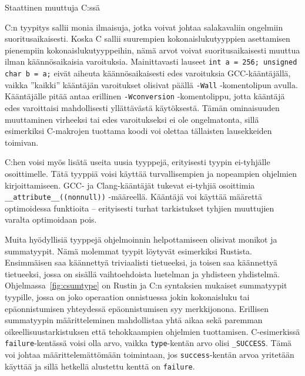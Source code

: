 \begin{listing}[ht!]
    \inputminted{C}{koodi/static.c}
    \caption{Staattinen muuttuja C:ssä}
    \label{fig:cstatic}
\end{listing}

C:n tyypitys sallii monia ilmaisuja, jotka voivat johtaa salakavaliin ongelmiin
suoritusaikaisesti. Koska C sallii suurempien kokonaislukutyyppien asettamisen
pienempiin kokonaislukutyyppeihin, nämä arvot voivat suoritusaikaisesti muuttua
ilman käännösaikaisia varoituksia. Mainittavasti lauseet \texttt{int a = 256;
unsigned char b = a;} eivät aiheuta käännösaikaisesti edes varoituksia
GCC-kääntäjällä, vaikka ''kaikki'' kääntäjän varoitukset olisivat päällä
\texttt{-Wall} -komentolipun avulla. Kääntäjälle pitää antaa erillinen
\texttt{-Wconversion} -komentolippu, jotta kääntäjä edes varoittaisi
mahdollisesti yllättävästä käytöksestä. Tämän ominaisuuden muuttaminen
virheeksi tai edes varoitukseksi ei ole ongelmatonta, sillä esimerkiksi
C-makrojen tuottama koodi voi olettaa tällaisten lausekkeiden toimivan.

C:hen voisi myös lisätä useita uusia tyyppejä, erityisesti tyypin ei-tyhjälle
osoittimelle. Tätä tyyppiä voisi käyttää turvallisempien ja nopeampien
ohjelmien kirjoittamiseen. GCC- ja Clang-kääntäjät tukevat ei-tyhjiä osoittimia
\texttt{\_\_attribute\_\_((nonnull))} -määreellä. Kääntäjä voi käyttää määrettä
optimoidessa funktioita -- erityisesti turhat tarkistukset tyhjien muuttujien
varalta optimoidaan pois.

Muita hyödyllisiä tyyppejä ohjelmoinnin helpottamiseen olisivat
monikot ja summatyypit. Nämä
molemmat tyypit löytyvät esimerkiksi Rustista. Ensimmäisen saa käännettyä
triviaalisti tietueeksi, ja toisen saa käännettyä tietueeksi, jossa on sisällä
vaihtoehdoista luetelman ja yhdisteen
yhdistelmä. Ohjelmassa~\ref{fig:csumtype} on Rustin ja C:n syntaksien mukaiset
summatyypit tyypille, jossa on joko operaation onnistuessa jokin kokonaisluku
tai epäonnistumisen yhteydessä epäonnistumisen syy merkkijonona. Erillisen
summatyypin määritteleminen mahdollistaa yhtä aikaa sekä paremman
oikeellisuustarkistuksen että tehokkaampien ohjelmien tuottamisen.
C-esimerkissä \texttt{failure}-kentässä voisi olla arvo, vaikka
\texttt{type}-kentän arvo olisi \texttt{\_SUCCESS}. Tämä voi johtaa
määrittelemättömään toimintaan, jos \texttt{success}-kentän arvoa yritetään
käyttää ja sillä hetkellä alustettu kenttä on \texttt{failure}.

